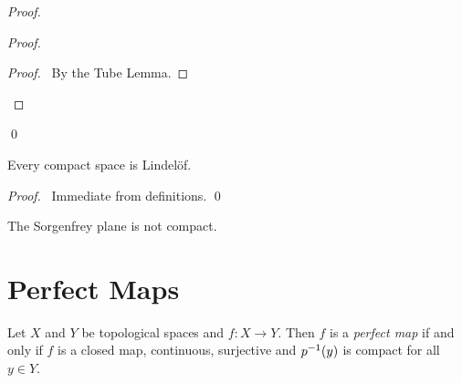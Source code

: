 \begin{proof}
    \pf
    \begin{proof}
        \begin{proof}
            \pf\ By the Tube Lemma.
        \end{proof}
    \end{proof}
    \qed
\end{proof}

\begin{proposition}
    Every compact space is Lindel\"{o}f.
\end{proposition}

\begin{proof}
    \pf\ Immediate from definitions. \qed
\end{proof}

\begin{corollary}
    The Sorgenfrey plane is not compact.
\end{corollary}

\section{Perfect Maps}

\begin{definition}
    Let $X$ and $Y$ be topological spaces and $f : X \rightarrow Y$. Then $f$ is a \emph{perfect map} if and only if $f$ is a closed map, continuous,
    surjective and ${p}^{-1}(y)$ is compact for all $y \in Y$.
\end{definition}


